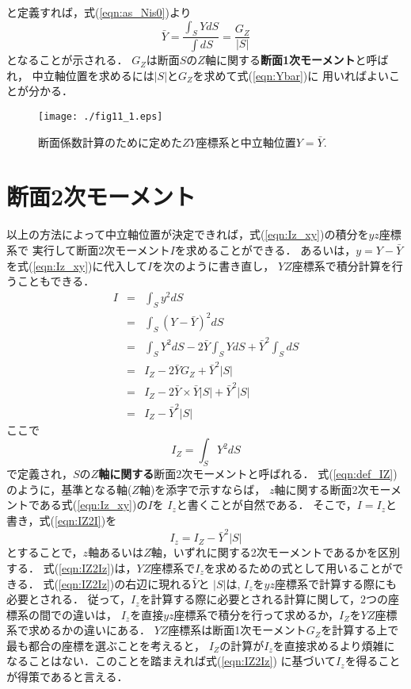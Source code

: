﻿\documentclass[10pt,a4j]{jbook}
\begin{document}
と定義すれば，式(\ref{eqn:as_Nis0})より
\begin{equation}
	\bar Y
	= \frac{\int_S YdS }{\int dS}
	= \frac{G_Z}{\left| S \right|}
	\label{eqn:Ybar}
\end{equation}
となることが示される． 
$G_Z$は断面$S$の$Z$軸に関する{\bf 断面1次モーメント}と呼ばれ，
中立軸位置を求めるには$\left|S\right|$と$G_Z$を求めて式(\ref{eqn:Ybar})に
用いればよいことが分かる．
\begin{figure}[h]
	\begin{center}
	\texttt{[image: ./fig11\_1.eps]} 
	\end{center}
	\caption{
		断面係数計算のために定めた$ZY$座標系と中立軸位置$Y=\bar Y$.
	} 
	\label{fig:fig11_1}
\end{figure}
\section{断面2次モーメント}
以上の方法によって中立軸位置が決定できれば，式(\ref{eqn:Iz_xy})の積分を$yz$座標系で
実行して断面2次モーメント$I$を求めることができる．
あるいは，$y=Y-\bar{Y}$を式(\ref{eqn:Iz_xy})に代入して$I$を次のように書き直し，
$YZ$座標系で積分計算を行うこともできる．
\begin{eqnarray}
	I &= &
	\int_S y^2 dS 
	\nonumber \\
	 &= &
	\int_S \left( Y-\bar{Y}\right)^2 dS 
	\nonumber \\
	 &= &
	\int_S Y^2dS -2\bar{Y}\int_S Y dS +\bar Y^2 \int_S dS
	\nonumber \\
	 &= &
	 I_Z-2\bar{Y}G_Z+\bar{Y}^2\left| S \right|
	\nonumber \\
	 &= &
	 I_Z-2\bar{Y}\times \bar{Y}\left| S \right|+\bar{Y}^2 \left| S \right|
	\nonumber \\
	 &= &
	 I_Z-\bar{Y}^2\left| S \right|
	\label{eqn:IZ2I}
\end{eqnarray}
ここで
\begin{equation}
	I_Z=\int_S Y^2 dS
	\label{eqn:def_IZ}
\end{equation}
で定義され，$S$の{\bf $Z$軸に関する}断面2次モーメントと呼ばれる．
式(\ref{eqn:def_IZ})のように，基準となる軸($Z$軸)を添字で示すならば，
$z$軸に関する断面2次モーメントである式(\ref{eqn:Iz_xy})の$I$を
$I_z$と書くことが自然である．
そこで，$I=I_z$と書き，式(\ref{eqn:IZ2I})を
\begin{equation}
	I_z=I_Z-\bar Y^2 \left| S \right|
	\label{eqn:IZ2Iz}
\end{equation}
とすることで，$z$軸あるいは$Z$軸，いずれに関する2次モーメントであるかを区別する．
式(\ref{eqn:IZ2Iz})は，$YZ$座標系で$I_z$を求めるための式として用いることができる．
式(\ref{eqn:IZ2Iz})の右辺に現れる$\bar{Y}$と
$\left| S\right|$は, $I_z$を$yz$座標系で計算する際にも必要とされる．
従って，$I_z$を計算する際に必要とされる計算に関して，2つの座標系の間での違いは，
$I_z$を直接$yz$座標系で積分を行って求めるか，$I_Z$を$YZ$座標系で求めるかの違いにある．
$YZ$座標系は断面1次モーメント$G_Z$を計算する上で最も都合の座標を選ぶことを考えると，
$I_Z$の計算が$I_z$を直接求めるより煩雑になることはない．このことを踏まえれば式(\ref{eqn:IZ2Iz})
に基づいて$I_z$を得ることが得策であると言える．
\end{document}
